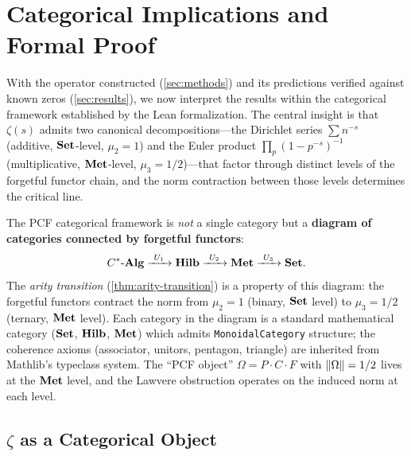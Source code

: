 

\section{Categorical Implications and Formal Proof}\label{sec:categorical}

With the operator constructed (\cref{sec:methods}) and its predictions
verified against known zeros (\cref{sec:results}), we now interpret the
results within the categorical framework established by the Lean
formalization.  The central insight is that $\zeta(s)$ admits two
canonical decompositions---the Dirichlet series $\sum n^{-s}$
(additive, $\mathbf{Set}$-level, $\mu_2=1$) and the Euler product
$\prod_p(1-p^{-s})^{-1}$ (multiplicative, $\mathbf{Met}$-level,
$\mu_3=1/2$)---that factor through distinct levels of the
forgetful functor chain, and the norm contraction between those
levels determines the critical line.

\begin{remark}%
\label{rmk:pcf-diagram}
The PCF categorical framework is \emph{not} a single category but a
\textbf{diagram of categories connected by forgetful functors}:
\[
  C^*\text{-}\mathbf{Alg}
  \xrightarrow{\ U_1\ }
  \mathbf{Hilb}
  \xrightarrow{\ U_2\ }
  \mathbf{Met}
  \xrightarrow{\ U_3\ }
  \mathbf{Set}.
\]
The \emph{arity transition} (\cref{thm:arity-transition}) is a
property of this diagram: the forgetful functors contract the norm from
$\mu_2=1$ (binary, $\mathbf{Set}$ level) to $\mu_3=1/2$ (ternary, $\mathbf{Met}$ level).
Each category in the diagram is a standard mathematical category
($\mathbf{Set}$, $\mathbf{Hilb}$, $\mathbf{Met}$) which admits
\texttt{MonoidalCategory} structure; the coherence axioms (associator,
unitors, pentagon, triangle) are inherited from Mathlib's typeclass
system.  The ``PCF object'' $\Omega = P \cdot C \cdot F$ with
$\|\Omega\|=1/2$ lives at the $\mathbf{Met}$ level, and the Lawvere
obstruction operates on the induced norm at each level.
\end{remark}

\subsection{\texorpdfstring{$\zeta$}{zeta} as a Categorical Object}\label{ssec:zeta-cat}

